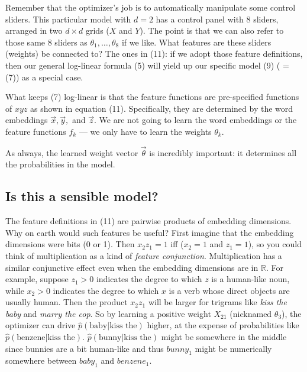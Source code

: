 Remember that the optimizer’s job is to automatically manipulate some control sliders. This particular model with $d=2$ has a control panel with 8 sliders, arranged in two $d \times d$ grids ($X$ and $Y$). The point is that we can also refer to those same 8 sliders as $\theta_1,\ldots,\theta_8$ if we like. What features are these sliders (weights) be connected to? The ones in (11): if we adopt those feature definitions, then our general log-linear formula (5) will yield up our specific model (9) ( = (7)) as a special case. 

What keeps (7) log-linear is that the feature functions are pre-specified functions of $xyz$ as shown in equation (11). Specifically, they are determined by the word embeddings $\vec{x}, \vec{y},$ and $\vec{z}$. We are not going to learn the word embeddings or the feature functions $f_k$ — we only have to learn the weights $\theta_k$.  

As always, the learned weight vector $\vec{\theta}$ is incredibly important: it determines all the probabilities in the model.  

\subsection*{Is this a sensible model?}
The feature definitions in (11) are pairwise products of embedding dimensions. Why on earth would such features be useful? First imagine that the embedding dimensions were bits (0 or 1). Then $x_2z_1=1$ iff ($x_2=1$ and $z_1=1$), so you could think of multiplication as a kind of \textit{feature conjunction}. Multiplication has a similar conjunctive effect even when the embedding dimensions are in $\mathbb{R}$. For example, suppose $z_1>0$ indicates the degree to which $z$ is a human-like noun, while $x_2>0$ indicates the degree to which $x$ is a verb whose direct objects are usually human. Then the product $x_2 z_1$ will be larger for trigrams like \textit{kiss the baby} and \textit{marry the cop}. So by learning a positive weight $X_{21}$ (nicknamed $\theta_3$), the optimizer can drive $\hat{p}(\text{baby}|\text{kiss the})$ higher, at the expense of probabilities like $\hat{p}(\text{benzene}|\text{kiss the})$. $\hat{p}(\text{bunny}|\text{kiss the})$ might be somewhere in the middle since bunnies are a bit human-like and thus $bunny_1$ might be numerically somewhere between $baby_1$ and $benzene_1$.


